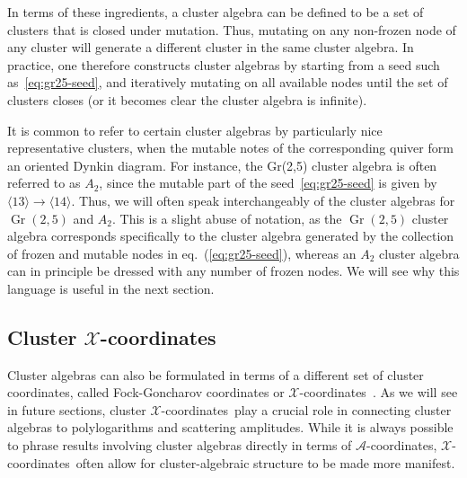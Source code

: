 \documentclass[11pt]{article}
\DeclareMathOperator{\Gr}{Gr}
\def\ket#1{\langle #1 \rangle}
\def\x{\mathcal{X}}
\def\xcoords{$\mathcal{X}$-coordinates}
\def\acoords{$\mathcal{A}$-coordinates}
\begin{document}
In terms of these ingredients, a cluster algebra can be defined to be a set of clusters that is closed under mutation. Thus, mutating on any non-frozen node of any cluster will generate a different cluster in the same cluster algebra. In practice, one therefore constructs cluster algebras by starting from a seed such as~\eqref{eq:gr25-seed}, and iteratively mutating on all available nodes until the set of clusters closes (or it becomes clear the cluster algebra is infinite). 

It is common to refer to certain cluster algebras by particularly nice representative clusters, when the mutable notes of the corresponding quiver form an oriented Dynkin diagram. For instance, the Gr(2,5) cluster algebra is often referred to as  $A_2$, since the mutable part of the seed~\eqref{eq:gr25-seed} is given by $\ket{13}\to\ket{14}$. Thus, we will often speak interchangeably of the cluster algebras for $\Gr(2,5)$ and $A_2$. This is a slight abuse of notation, as the $\Gr(2,5)$ cluster algebra corresponds specifically to the cluster algebra generated by the collection of frozen and mutable nodes in eq.~(\ref{eq:gr25-seed}), whereas an $A_2$ cluster algebra can in principle be dressed with any number of frozen nodes. We will see why this language is useful in the next section.

\subsection{Cluster \texorpdfstring{$\mathcal{X}$}{X}-coordinates}

Cluster algebras can also be formulated in terms of a different set of cluster coordinates, called Fock-Goncharov coordinates or $\x$-coordinates~\cite{FG03b}. As we will see in future sections, cluster \xcoords\ play a crucial role in connecting cluster algebras to polylogarithms and scattering amplitudes. While it is always possible to phrase results involving cluster algebras directly in terms of \acoords, \xcoords\ often allow for cluster-algebraic structure to be made more manifest. 
\end{document}
